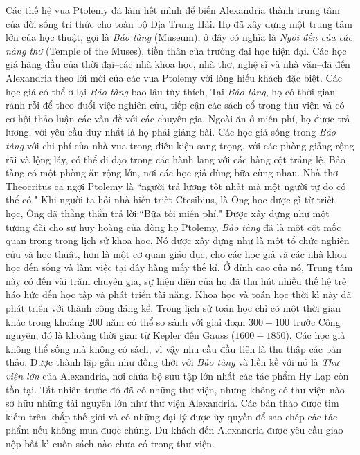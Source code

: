 \begin{multicols}{2}
	\vskip 0.1cm
	Các thế hệ vua Ptolemy đã làm hết mình để biến Alexandria thành trung tâm của đời sống trí thức cho toàn bộ Địa Trung Hải. Họ đã xây dựng một trung tâm lớn của học thuật, gọi là \textit{Bảo tàng} (Museum), ở đây có nghĩa là \textit{Ngôi đền của các nàng thơ} (Temple of the Muses), tiền thân của trường đại học hiện đại. Các học giả hàng đầu của thời đại--các nhà khoa học, nhà thơ, nghệ sĩ và nhà văn--đã đến Alexandria theo lời mời của các vua Ptolemy với lòng hiếu khách đặc biệt. Các học giả có thể ở lại \textit{Bảo tàng} bao lâu tùy thích, Tại \textit{Bảo tàng}, họ có thời gian rảnh rỗi để theo đuổi việc nghiên cứu, tiếp cận các sách cổ trong thư viện và có cơ hội thảo luận các vấn đề với các chuyên gia.  Ngoài ăn ở miễn phí, họ được trả lương, với yêu cầu duy nhất là họ phải giảng bài. Các học giả sống trong \textit{Bảo tàng} với chi phí của nhà vua trong điều kiện sang trọng, với các phòng giảng rộng rãi và lộng lẫy, có thể đi dạo trong các hành lang với các hàng cột tráng lệ. Bảo tàng có một phòng ăn rộng lớn, nơi các học giả dùng bữa cùng nhau. Nhà thơ Theocritus ca ngợi Ptolemy là ``người trả lương tốt nhất mà một người tự do có thể có." Khi người ta hỏi nhà hiền triết Ctesibius, là Ông học được gì từ triết học, Ông đã thẳng thắn trả lời:``Bữa tối miễn phí."
	\vskip 0.1cm
	Được xây dựng như một tượng đài cho sự huy hoàng của dòng họ Ptolemy, \textit{Bảo tàng} đã là một cột mốc quan trọng trong lịch sử khoa học. Nó được xây dựng như là một tổ chức nghiên cứu và học thuật, hơn là một cơ quan giáo dục, cho các học giả và các nhà khoa học đến sống và làm việc tại đây hàng mấy thế kỉ. Ở đỉnh cao của nó, Trung tâm này có đến vài trăm chuyên gia, sự hiện diện của họ đã thu hút nhiều thế hệ trẻ háo hức đến học tập và phát triển tài năng. Khoa học và toán học thời kì này đã phát triển với thành công đáng kể. Trong lịch sử toán học chỉ có một thời gian khác trong khoảng $200$ năm có thể so sánh với giai đoạn $300-100$ trước Công nguyên, đó là khoảng thời gian từ Kepler đến Gauss ($1600-1850$).
	\vskip 0.1cm
	Các học giả không thể sống mà không có sách, vì vậy nhu cầu đầu tiên là thu thập các bản thảo. Được thành lập gần như đồng thời với \textit{Bảo tàng} và liền kề với nó là \textit{Thư viện lớn} của Alexandria, nơi chứa bộ sưu tập lớn nhất các tác phẩm Hy Lạp còn tồn tại. Tất nhiên trước đó đã có những thư viện, nhưng không có thư viện nào sở hữu những tài nguyên lớn như thư viện Alexandria. Các bản thảo được tìm kiếm trên khắp thế giới và có những đại lý được ủy quyền để sao chép các tác phẩm nếu không mua được chúng. Du khách đến Alexandria được yêu cầu giao nộp bất kì cuốn sách nào chưa có trong thư viện.

\end{multicols}
